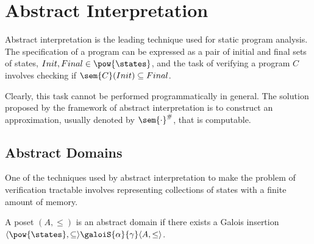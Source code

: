 \section{Abstract Interpretation}

Abstract interpretation \cite{Cousot77} is the leading technique used for static 
program analysis. The specification of a program can be expressed as a pair of 
initial and final sets of states, $Init, Final \in \pow{\states}$, and the task 
of verifying a program $C$ involves checking if $\sem{C}(Init) \subseteq Final$.

Clearly, this task cannot be performed programmatically in general. The solution 
proposed by the framework of abstract interpretation is to construct an 
approximation, usually denoted by $\sem{\cdot}^\#$, that is computable.

\subsection{Abstract Domains}

One of the techniques used by abstract interpretation to make the problem of 
verification tractable involves representing collections of states with a finite 
amount of memory.

\begin{definition}
  A poset $(A, \leq)$ is an abstract domain if there exists a Galois insertion
  $\langle \pow{\states}, \subseteq \rangle \galoiS{\alpha}{\gamma} \langle A, 
  \leq \rangle$.
\end{definition}

